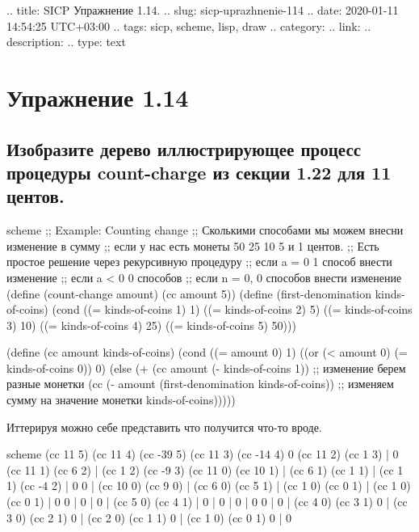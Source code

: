 .. title: SICP Упражнение 1.14.
.. slug: sicp-uprazhnenie-114
.. date: 2020-01-11 14:54:25 UTC+03:00
.. tags: sicp, scheme, lisp, draw
.. category: 
.. link: 
.. description: 
.. type: text

\chapter{Упражнение 1.14}

\section{Изобразите дерево иллюстрирующее процесс процедуры count-charge из секции 1.22 для 11 центов.}

\begin{codelisting}{scheme}
;; Example: Counting change
;; Сколькими способами мы можем внесни изменение в сумму
;; если у нас есть монеты 50 25 10 5 и 1 центов.
;; Есть простое решение через рекурсивную процедуру
;; если a = 0 1 способ внести изменение
;; если a < 0 0 способов
;; если n = 0, 0 способов внести изменение
(define (count-change amount)
  (cc amount 5))
(define (first-denomination kinds-of-coins)
  (cond ((= kinds-of-coins 1) 1)
        ((= kinds-of-coins 2) 5)
        ((= kinds-of-coins 3) 10)
        ((= kinds-of-coins 4) 25)
        ((= kinds-of-coins 5) 50)))

(define (cc amount kinds-of-coins)
  (cond ((= amount 0) 1)
        ((or (< amount 0) (= kinds-of-coins 0)) 0)
        (else (+ (cc amount
                     (- kinds-of-coins 1)) ;; изменение берем разные монетки
                 (cc (- amount
                        (first-denomination kinds-of-coins)) ;; изменяем сумму на значение монетки
                     kinds-of-coins)))))
\end{codelisting}

Иттерируя можно себе представить что получится что-то вроде.
\begin{codelisting}{scheme}
                            (cc 11 5)
                     (cc 11 4)     (cc -39 5)
                (cc 11 3) (cc -14 4)      0
           (cc 11 2) (cc 1 3) | 0
      (cc 11 1) (cc 6 2) | (cc 1 2) (cc -9 3)
 (cc 11 0) (cc 10 1) | (cc 6 1) (cc 1 1) | (cc 1 1) (cc -4 2) | 0
    0 | (cc 10 0) (cc 9 0) | (cc 6 0) (cc 5 1) | (cc 1 0) (cc 0 1) | (cc 1 0) (cc 0 1) | 0
          0 | 0 | 0 | (cc 5 0) (cc 4 1) | 0 | 0 | 0 | 0
          0 | 0 | (cc 4 0) (cc 3 1)
          0 | (cc 3 0) (cc 2 1)
          0 | (cc 2 0) (cc 1 1)
          0 | (cc 1 0) (cc 0 1)
          0 | 0
\end{codelisting}

